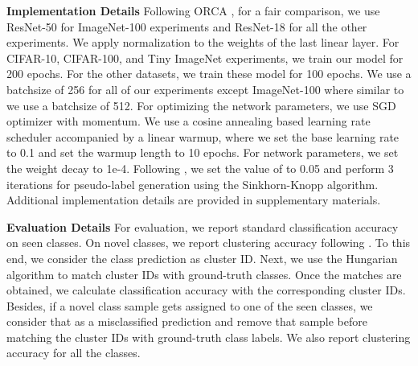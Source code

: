 \documentclass[runningheads]{eccv2022submission}
\begin{document}
\vspace{1mm}
\label{para:implimentation}
\noindent \textbf{Implementation Details} Following ORCA \cite{cao2022openworld}, for a fair comparison, we use ResNet-50 \cite{he2016deep} for ImageNet-100 experiments and ResNet-18 \cite{he2016deep} for all the other experiments. We apply  normalization to the weights of the last linear layer. For CIFAR-10, CIFAR-100, and Tiny ImageNet experiments, we train our model for 200 epochs. For the other datasets, we train these model for 100 epochs. We use a batchsize of 256 for all of our experiments except ImageNet-100 where similar to \cite{cao2022openworld} we use a batchsize of 512. For optimizing the network parameters, we use SGD optimizer with momentum. We use a cosine annealing based learning rate scheduler accompanied by a linear warmup, where we set the base learning rate to 0.1 and set the warmup length to 10 epochs. For network parameters, we set the weight decay to 1e-4. Following \cite{caron2020unsupervised}, we set the value of  to 0.05 and perform 3 iterations for pseudo-label generation using the Sinkhorn-Knopp algorithm. Additional implementation details are provided in supplementary materials.

\vspace{1mm}
\noindent \textbf{Evaluation Details} For evaluation, we report standard classification accuracy on seen classes. On novel classes, we report clustering accuracy following \cite{cao2022openworld,Han2020Automatically,fini2021unified,han2019learning}. To this end, we consider the class prediction as cluster ID. Next, we use the Hungarian algorithm \cite{kuhn1955hungarian} to match cluster IDs with ground-truth classes. Once the matches are obtained, we calculate classification accuracy with the corresponding cluster IDs. Besides, if a novel class sample gets assigned to one of the seen classes, we consider that as a misclassified prediction and remove that sample before matching the cluster IDs with ground-truth class labels. We also report clustering accuracy for all the classes.
\end{document}
